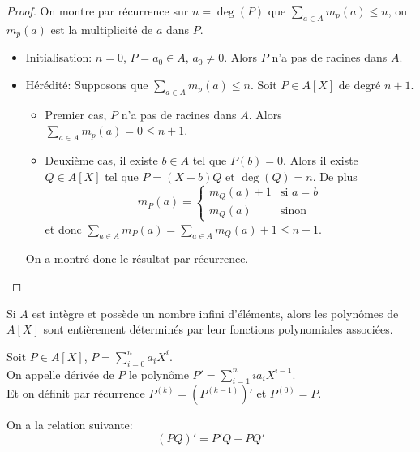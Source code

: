 \begin{proof}
	On montre par récurrence sur $n = \deg(P)$ que $\sum\limits_{a \in A} m_p(a) \leq n$, ou $m_p(a)$ est la multiplicité de $a$ dans $P$.

	\begin{itemize}
		\item Initialisation: $n = 0$, $P = a_0 \in A$, $a_0 \neq 0$.
		      Alors $P$ n'a pas de racines dans $A$.
		\item Hérédité: Supposons que $\sum\limits_{a \in A} m_p(a) \leq n$. Soit $P \in A[X]$ de degré $n+1$.
		      \begin{itemize}
			      \item Premier cas, $P$ n'a pas de racines dans $A$.
			            Alors $\sum\limits_{a \in A} m_p(a) = 0 \leq n+1$.
			      \item Deuxième cas, il existe $b \in A$ tel que $P(b) = 0$.
			            Alors il existe $Q \in A[X]$ tel que $P = (X-b)Q$
			            et $\deg(Q) = n$. De plus
			            $$ m_P(a) = \left\{ \begin{array}{ll}
					            m_Q(a) + 1 & \text{si } a = b \\
					            m_Q(a)     & \text{sinon}
				            \end{array} \right. $$
			            et donc $\sum\limits_{a \in A} m_P(a) = \sum\limits_{a \in A} m_Q(a) + 1 \leq n+1$.
		      \end{itemize}

		      On a montré donc le résultat par récurrence.
	\end{itemize}
\end{proof}

\begin{coro}
	Si $A$ est intègre et possède un nombre infini d'éléments, alors les polynômes de $A[X]$ sont entièrement déterminés par leur fonctions polynomiales associées.
\end{coro}

\begin{definition}
	Soit $P \in A[X]$, $P = \sum\limits_{i=0}^n a_iX^i$. \\
	On appelle dérivée de $P$ le polynôme $P' = \sum\limits_{i=1}^n ia_iX^{i-1}$.\\
	Et on définit par récurrence $P^{(k)} = (P^{(k-1)})'$ et $P^{(0)} = P$.
\end{definition}

\begin{prop}
	On a la relation suivante:
	$$ (PQ)' = P'Q + PQ' $$
\end{prop}

